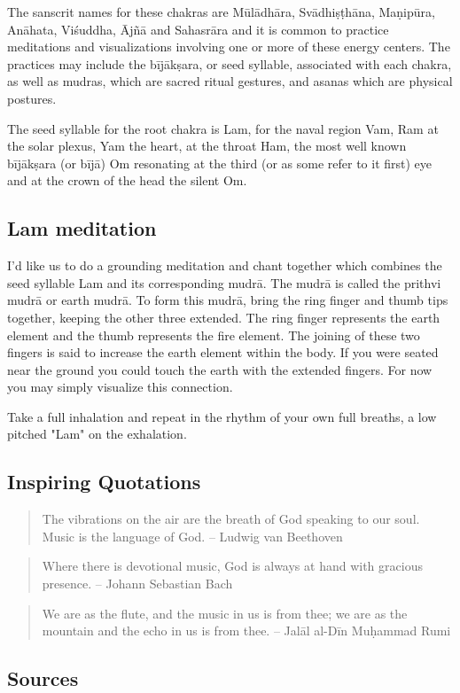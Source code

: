 \documentclass[12pt]{article}
\begin{document}
The sanscrit names for these chakras are Mūlādhāra, Svādhiṣṭhāna, Maṇipūra, Anāhata, Viśuddha, Ājñā and Sahasrāra and it is common to practice meditations and visualizations involving one or more of these energy centers. The practices may include the bījākṣara, or seed syllable, associated with each chakra, as well as mudras, which are sacred ritual gestures, and asanas which are physical postures.

The seed syllable for the root chakra is Lam, for the naval region Vam, Ram at the solar plexus, Yam the heart, at the throat Ham, the most well known bījākṣara (or bījā) Om resonating at the third (or as some refer to it first) eye and at the crown of the head the silent Om.

\subsection*{Lam meditation}

I'd like us to do a grounding meditation and chant together which combines the seed syllable Lam and its corresponding mudrā. The mudrā is called the prithvi mudrā or earth mudrā. To form this mudrā, bring the ring finger and thumb tips together, keeping the other three extended. The ring finger represents the earth element and the thumb represents the fire element. The joining of these two fingers is said to increase the earth element within the body. If you were seated near the ground you could touch the earth with the extended fingers. For now you may simply visualize this connection.

Take a full inhalation and repeat in the rhythm of your own full breaths, a low pitched "Lam" on the exhalation.

\subsection*{Inspiring Quotations}

\begin{quote}
  The vibrations on the air are the breath of God speaking to our soul. Music is the language of God. – Ludwig van Beethoven
\end{quote}

\begin{quote}
  Where there is devotional music, God is always at hand with gracious presence. – Johann Sebastian Bach
\end{quote}

\begin{quote}
  We are as the flute, and the music in us is from thee; we are as the mountain and the echo in us is from thee. – Jalāl al-Dīn Muḥammad Rumi
\end{quote}




\subsection*{Sources}

\end{document}
